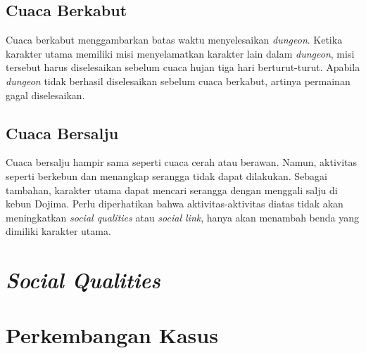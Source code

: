 \subsection{Cuaca Berkabut}
Cuaca berkabut menggambarkan batas waktu menyelesaikan \textit{dungeon}. Ketika karakter utama memiliki misi menyelamatkan karakter lain dalam \textit{dungeon}, misi tersebut harus diselesaikan sebelum cuaca hujan tiga hari berturut-turut. Apabila \textit{dungeon} tidak berhasil diselesaikan sebelum cuaca berkabut, artinya permainan gagal diselesaikan.

\subsection{Cuaca Bersalju}
Cuaca bersalju hampir sama seperti cuaca cerah atau berawan. Namun, aktivitas seperti berkebun dan menangkap serangga tidak dapat dilakukan. Sebagai tambahan, karakter utama dapat mencari serangga dengan menggali salju di kebun Dojima. Perlu diperhatikan bahwa aktivitas-aktivitas diatas tidak akan meningkatkan \textit{social qualities} atau \textit{social link}, hanya akan menambah benda yang dimiliki karakter utama.


\section{\textit{Social Qualities}}

\section{Perkembangan Kasus}





\blindtext